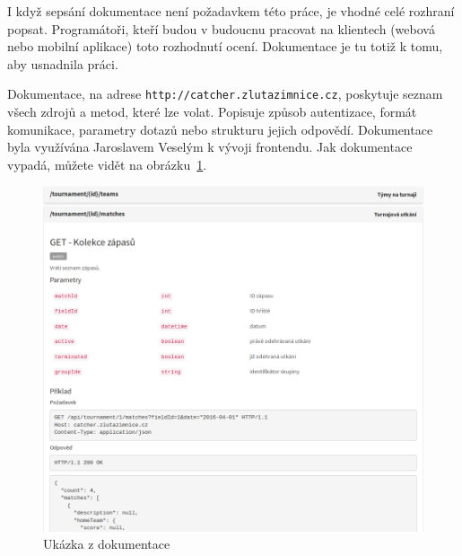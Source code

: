 
I když sepsání dokumentace není požadavkem této práce, je vhodné celé rozhraní popsat. Programátoři,
kteří budou v budoucnu pracovat na klientech (webová nebo mobilní aplikace) toto rozhodnutí ocení.
Dokumentace je tu totiž k tomu, aby usnadnila práci.

Dokumentace, na adrese \texttt{http://catcher.zlutazimnice.cz},
poskytuje seznam všech zdrojů a metod, které lze volat. Popisuje způsob autentizace,
formát komunikace, parametry dotazů nebo strukturu jejich odpovědí.
Dokumentace byla využívána Jaroslavem Veselým k vývoji frontendu. Jak dokumentace vypadá, můžete vidět na obrázku~\ref{fig:doc}.

\begin{figure}[ht!]
\centering
\includegraphics[width=130mm]{./images/doc.png}
\caption{Ukázka z dokumentace\label{overflow}}
\label{fig:doc}
\end{figure}



